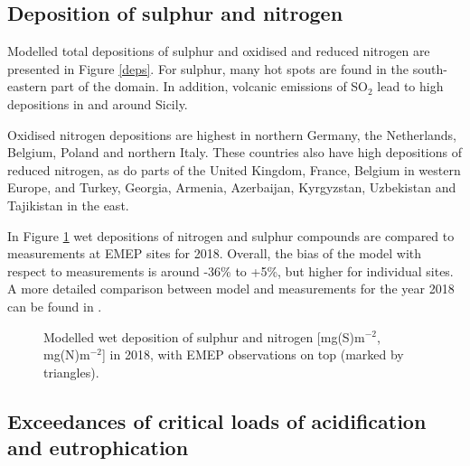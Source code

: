 \subsection{Deposition of sulphur and nitrogen} %
\label{subs:dep}

Modelled total depositions of sulphur and oxidised and reduced nitrogen are presented in Figure \ref{deps}.
For sulphur, many hot spots are found in the south-eastern part of the domain. In addition, volcanic emissions of SO$_2$ lead to high depositions in and around Sicily.

Oxidised nitrogen depositions are highest in northern Germany, the Netherlands, Belgium, Poland and northern Italy. These countries also have high depositions of reduced nitrogen, as do parts of the United Kingdom, France, Belgium in western Europe, and Turkey, Georgia, Armenia, Azerbaijan, Kyrgyzstan, Uzbekistan and Tajikistan in the east. 

In Figure \ref{wdeps} wet depositions of nitrogen and sulphur compounds are compared to measurements at EMEP sites for 2018. Overall, the bias of the model with respect to measurements is around 
-36\% to +5\%, but higher for individual sites. A more detailed comparison between model and measurements for the year 2018 can be found in \cite{WEB2020:SN}.

\begin{figure}[H]
  \centering
 \caption{Modelled wet deposition of sulphur and nitrogen [mg(S)m$^{-2}$, mg(N)m$^{-2}$] in 2018, with EMEP observations on top (marked by triangles).}
\label{wdeps}
\end{figure}

\subsection{Exceedances of critical loads of acidification and eutrophication}\label{subs:exceedSnN}

